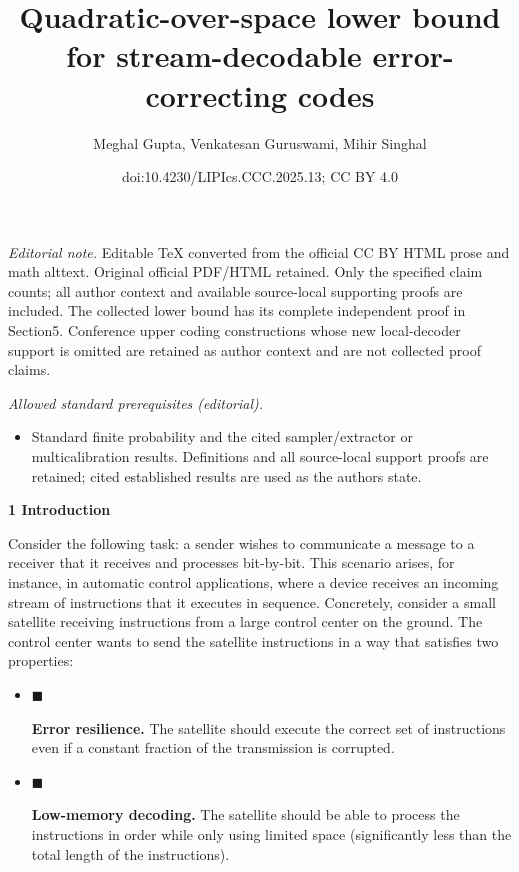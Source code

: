 \documentclass[10pt,a4paper]{article}
\title{Quadratic-over-space lower bound for stream-decodable error-correcting codes}
\author{Meghal Gupta, Venkatesan Guruswami, Mihir Singhal}
\date{doi:10.4230/LIPIcs.CCC.2025.13; CC BY 4.0}
\begin{document}
\maketitle
\noindent\textit{Editorial note.} Editable TeX converted from the official CC BY HTML prose and math alttext. Original official PDF/HTML retained. Only the specified claim counts; all author context and available source-local supporting proofs are included. The collected lower bound has its complete independent proof in Section5. Conference upper coding constructions whose new local-decoder support is omitted are retained as author context and are not collected proof claims.\par\medskip
\noindent\textit{Allowed standard prerequisites (editorial).}\begin{itemize}
\item Standard finite probability and the cited sampler/extractor or multicalibration results. Definitions and all source-local support proofs are retained; cited established results are used as the authors state.
\end{itemize}\medskip


\par\medskip\noindent\textbf{
1 Introduction}\par




Consider the following task: a sender wishes to communicate a message to a receiver that it receives and processes bit-by-bit. This scenario arises, for instance, in automatic control applications, where a device receives an incoming stream of instructions that it executes in sequence. Concretely, consider a small satellite receiving instructions from a large control center on the ground. The control center wants to send the satellite instructions in a way that satisfies two properties:\par


\begin{itemize}


\item[] 
$\blacksquare$ 


\textbf{Error resilience.} The satellite should execute the correct set of instructions even if a constant fraction of the transmission is corrupted.\par





\item[] 
$\blacksquare$ 


\textbf{Low-memory decoding.} The satellite should be able to process the instructions in order while only using limited space (significantly less than the total length of the instructions).\par





\end{itemize}
\end{document}

